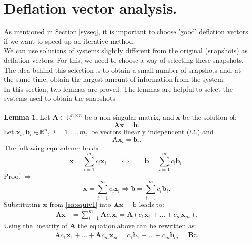 \documentclass[review]{elsarticle}
\begin{document}
\section{Deflation vector analysis.}\label{as}
As mentioned in Section \ref{syseq}, it is important to choose 'good' deflation vectors if we want to speed up an iterative method.\\ 
We can use solutions of systems slightly different from the original (snapshots) as deflation vectors.
For this, we need to choose a way of selecting these snapshots. The idea behind this selection is to obtain a small number of snapshots and, at the same time,
obtain the largest amount of information from the system.\\
In this section, two lemmas are proved. The lemmas are helpful to select the systems used to obtain the snapshots.\\\\
\textbf{Lemma 1.} 
Let $\mathbf{A} \in \mathbb{R}^{n\times n}$ be a non-singular matrix, and $\mathbf{x}$ be the solution of:
\begin{equation}\label{eq:ls}
\mathbf{A}\mathbf{x}=\mathbf{b}.
\end{equation}
Let $ \mathbf{x}_i, \mathbf{b}_i \in \mathbb{R}^{n},$ $i=1,...,m,$ be
vectors linearly independent ($l.i.$) and 
\begin{equation}\label{eq:lieq}
\mathbf{A}\mathbf{x}_i=\mathbf{b}_i.
\end{equation}
The following equivalence holds
\begin{equation}\label{eq:equiv}
\mathbf{x}=\sum_{i=1}^m {c}_i\mathbf{x}_i \qquad
\Leftrightarrow \qquad
\mathbf{b}=\sum_{i=1}^m {c}_i\mathbf{b}_i.
\end{equation}
Proof $\Rightarrow$
\begin{equation}\label{eq:equiv1}
\mathbf{x}=\sum_{i=1}^m {c}_i\mathbf{x}_i 
\Rightarrow 
\mathbf{b}=\sum_{i=1}^m {c}_i\mathbf{b}_i.
\end{equation}
Substituting $\mathbf{x}$ from \eqref{eq:equiv1} into $\mathbf{A}\mathbf{x}=\mathbf{b}$ leads to:
\begin{align*}
\mathbf{A}\mathbf{x}&=\sum_{i=1}^m \mathbf{A}{c}_i\mathbf{x}_i=\mathbf{A}(c_1\mathbf{x}_1+...+c_m\mathbf{x}_m).
\end{align*}
Using the linearity of $\mathbf{A}$ the equation above can be rewritten as:
\begin{align}\label{eq:bc}
\mathbf{A}c_1\mathbf{x}_1+...+\mathbf{A}c_m\mathbf{x}_m
=c_1\mathbf{b}_1+...+c_m\mathbf{b}_m=\mathbf{B}\mathbf{c}.
\end{align}
\end{document}

